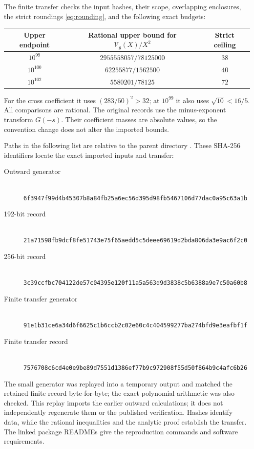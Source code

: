 \documentclass[11pt]{article}
\theoremstyle{remark}
\newcommand{\Vcal}{\mathcal V_g}
\numberwithin{equation}{section}
\begin{document}
The finite transfer \cite{FiniteCertificate} checks the input hashes,
their scope, overlapping enclosures, the strict roundings
\eqref{eq:rounding}, and the following exact budgets:
\begin{center}
\begin{tabular}{ccc}
\toprule
Upper endpoint & Rational upper bound for $\Vcal(X)/X^2$ & Strict ceiling\\
\midrule
$10^{99}$ & $2955558057/78125000$ & $38$\\
$10^{100}$ & $62255877/1562500$ & $40$\\
$10^{102}$ & $5580201/78125$ & $72$\\
\bottomrule
\end{tabular}
\end{center}
For the cross coefficient it uses $(283/50)^2>32$; at $10^{99}$ it
also uses $\sqrt{10}<16/5$. All comparisons are rational.
The original records use the minus-exponent transform $G(-s)$.
Their coefficient masses are absolute values, so the convention change
does not alter the imported bounds.

Paths in the following list are relative to the parent directory
.
These SHA-256 identifiers locate the exact imported inputs and transfer:
\begin{description}
\item[Outward generator] \\
\nolinkurl{6f3947f99d4b45307b8a84fb25a6ec56d395d98fb5467106d77dac0a95c63a1b}
\item[192-bit record] \\
\nolinkurl{21a71598fb9dcf8fe51743e75f65aedd5c5deee69619d2bda806da3e9ac6f2c0}
\item[256-bit record] \\
\nolinkurl{3c39ccfbc704122de57c04395e120f11a5a563d9d3838c5b6388a9e7c50a60b8}
\item[Finite transfer generator] \\
\nolinkurl{91e1b31ce6a34d6f6625c1b6ccb2c02e60c4c404599277ba274bfd9e3eafbf1f}
\item[Finite transfer record] \\
\nolinkurl{7576708c6cd4e0e9be89d7551d1386ef77b9c972908f55d50f864b9c4afc6b26}
\end{description}
The small generator was replayed into a temporary output and matched the
retained finite record byte-for-byte; the exact polynomial arithmetic
was also checked. This replay imports the earlier outward calculations;
it does not independently regenerate them or the published verification.
Hashes identify data, while the rational inequalities and the analytic
proof establish the transfer. The linked package READMEs give the
reproduction commands and software requirements.
\end{document}
